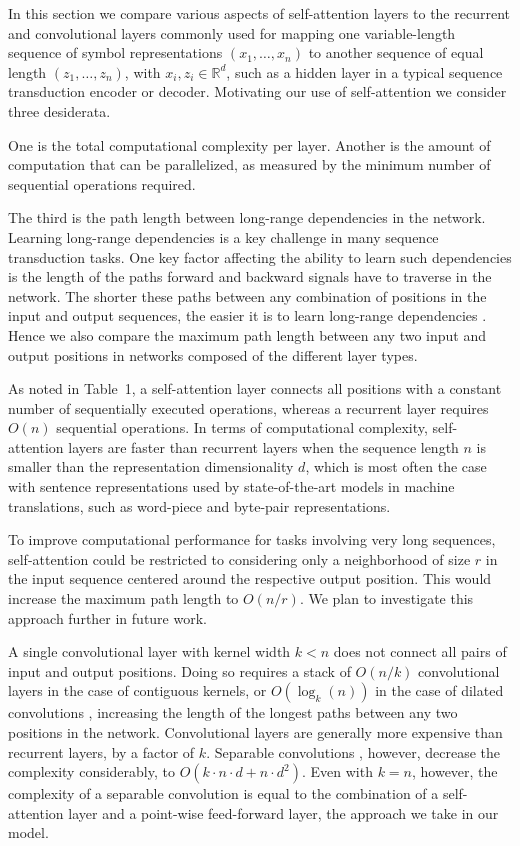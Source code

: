 In this section we compare various aspects of self-attention layers to the
recurrent and convolutional layers commonly used for mapping one variable-length
sequence of symbol representations $(x_1, \ldots, x_n)$ to another sequence of
equal length $(z_1, \ldots, z_n)$, with $x_i, z_i \in \mathbb{R}^d$, such as a
hidden layer in a typical sequence transduction encoder or decoder. Motivating
our use of self-attention we consider three desiderata.

One is the total computational complexity per layer. Another is the amount of
computation that can be parallelized, as measured by the minimum number of
sequential operations required.

The third is the path length between long-range dependencies in the network.
Learning long-range dependencies is a key challenge in many sequence
transduction tasks. One key factor affecting the ability to learn such
dependencies is the length of the paths forward and backward signals have to
traverse in the network. The shorter these paths between any combination of
positions in the input and output sequences, the easier it is to learn
long-range dependencies \cite{hochreiter2001gradient}. Hence we also compare
the maximum path length between any two input and output positions in networks
composed of the different layer types.

As noted in Table~1, a self-attention layer connects all positions with a
constant number of sequentially executed operations, whereas a recurrent layer
requires $O(n)$ sequential operations. In terms of computational complexity,
self-attention layers are faster than recurrent layers when the sequence length
$n$ is smaller than the representation dimensionality $d$, which is most often
the case with sentence representations used by state-of-the-art models in
machine translations, such as word-piece \cite{wu2016google} and byte-pair
\cite{sennrich2015neural} representations.

To improve computational performance for tasks involving very long sequences,
self-attention could be restricted to considering only a neighborhood of size
$r$ in the input sequence centered around the respective output position. This
would increase the maximum path length to $O(n/r)$. We plan to investigate this
approach further in future work.

A single convolutional layer with kernel width $k < n$ does not connect all
pairs of input and output positions. Doing so requires a stack of $O(n/k)$
convolutional layers in the case of contiguous kernels, or $O(\log_k(n))$ in the
case of dilated convolutions \cite{yu2015multi}, increasing the length of the
longest paths between any two positions in the network. Convolutional layers are
generally more expensive than recurrent layers, by a factor of $k$. Separable
convolutions \cite{chollet2016xception}, however, decrease the complexity
considerably, to $O(k \cdot n \cdot d + n \cdot d^2)$. Even with $k = n$,
however, the complexity of a separable convolution is equal to the combination
of a self-attention layer and a point-wise feed-forward layer, the approach we
take in our model.

